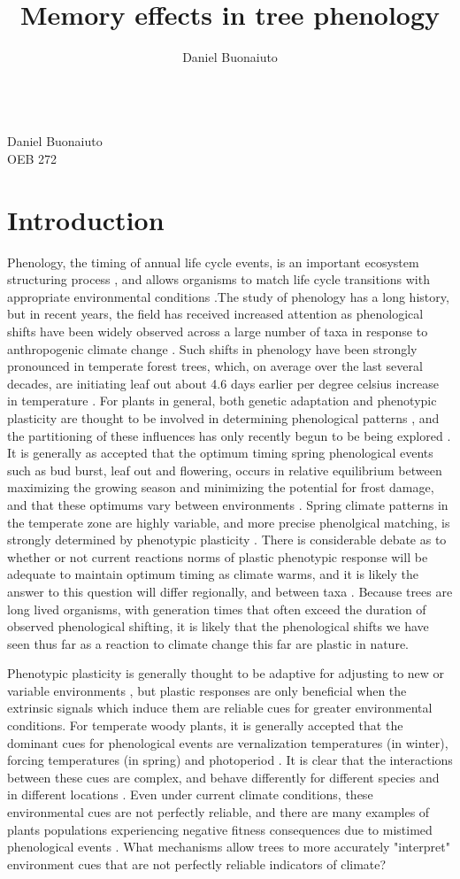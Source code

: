 \documentclass{article}\usepackage[]{graphicx}\usepackage[]{color}
\begin{document}
\title{Memory effects in tree phenology}
\author{Daniel Buonaiuto}
\data{\today}\\
Daniel Buonaiuto\\
OEB 272
\section*{Introduction}
\par Phenology, the timing of annual life cycle events, is an important ecosystem structuring process \citep{}, and allows organisms to match life cycle transitions with appropriate environmental conditions \citep{}.The study of phenology has a long history, but in recent years, the field has received increased attention as phenological shifts have been widely observed across a large number of taxa in response to anthropogenic climate change \citep{Menzel2006}. Such shifts in phenology have been strongly pronounced in temperate forest trees, which, on average over the last several decades, are initiating leaf out about 4.6 days earlier per degree celsius increase in temperature \citep{Wolkovich2012}. For plants in general, both genetic adaptation and phenotypic plasticity are thought to be involved in determining phenological patterns \citep{}, and the partitioning of these influences has only recently begun to be being explored \citep{}. It is generally as accepted that the optimum timing spring phenological events such as bud burst, leaf out and flowering, occurs in relative equilibrium between maximizing the growing season and minimizing the potential for frost damage, and that these optimums vary between environments \citep{Kramer1995}. Spring climate patterns in the temperate zone are highly variable, and more precise phenolgical matching, is strongly determined by phenotypic plasticity \citep{}. There is considerable debate as to whether or not current reactions norms of plastic phenotypic response will be adequate to maintain optimum timing as climate warms, and it is likely the answer to this question will differ regionally, and between taxa \citep{}. Because trees are long lived organisms, with generation times that often exceed the duration of observed phenological shifting, it is likely that the phenological shifts we have seen thus far as a reaction to climate change this far are plastic in nature.
\par  Phenotypic plasticity is generally thought to be adaptive for adjusting to new or variable environments \citep{}, but plastic responses are only beneficial when the extrinsic signals which induce them are reliable cues for greater environmental conditions. For temperate woody plants, it is generally accepted that the dominant cues for phenological events are vernalization temperatures (in winter), forcing temperatures (in spring) and photoperiod \citep{}. It is clear that the interactions between these cues are complex, and behave differently for different species and in different locations \citep{}. Even under current climate conditions, these environmental cues are not perfectly reliable, and there are many examples of plants populations experiencing negative fitness consequences due to mistimed phenological events \cite{Inouye2008}. What mechanisms allow trees to more accurately "interpret" environment cues that are not perfectly reliable indicators of climate?
\end{document}
